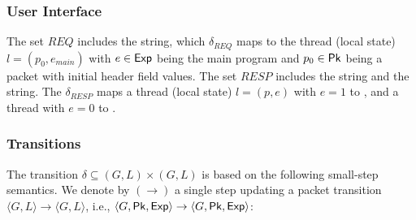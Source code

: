 	\subsubsection{User Interface}
	The set \( REQ \) includes the \SPAWN{} string, which \( \delta_{REQ} \) 
	maps to the thread (local state) \( l = (p_0, e_{main}) \) with \( e \in \mathsf{Exp} 
	\) being the main program and \( p_0 \in \mathsf{Pk} \) being a packet with initial 
	header field values. The set \( RESP \) includes the \DONE{} string and 
	the \DROP{} string. The \( \delta_{RESP} \) maps a thread (local state) \( 
	l = (p, e) \) with \( e = 1 \) to \DONE, and a thread with \( e = 0 \) 
	to \DROP.
	
	
	\subsubsection{Transitions}
	The transition \( \delta \subseteq (G, L) \times (G, L) \) is based on the 
	following small-step semantics.
	We denote by \( (\rightarrow) \) a single step updating a packet transition 
	\(\langle G,L \rangle \rightarrow \langle G,L \rangle\), i.e., 
	\(\langle G,\mathsf{Pk}, \mathsf{Exp} \rangle \rightarrow \langle G,\mathsf{Pk}, \mathsf{Exp} \rangle\):
	

